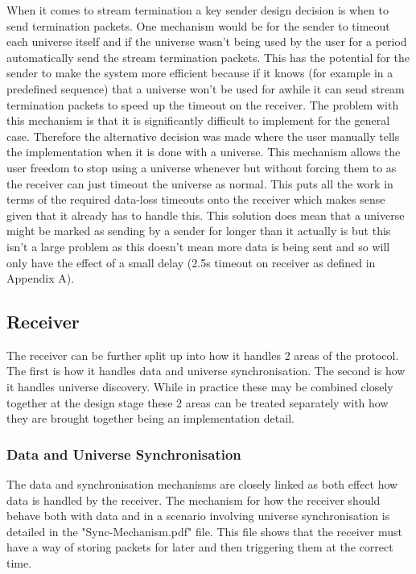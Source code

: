 \documentclass[11pt,a4paper]{article}
\begin{document}
When it comes to stream termination a key sender design decision is when to send termination packets. One mechanism would be for the sender to timeout each universe itself and if the universe wasn't being used by the user for a period automatically send the stream termination packets. This has the potential for the sender to make the system more efficient because if it knows (for example in a predefined sequence) that a universe won't be used for awhile it can send stream termination packets to speed up the timeout on the receiver. The problem with this mechanism is that it is significantly difficult to implement for the general case. Therefore the alternative decision was made where the user manually tells the implementation when it is done with a universe. This mechanism allows the user freedom to stop using a universe whenever but without forcing them to as the receiver can just timeout the universe as normal. This puts all the work in terms of the required data-loss timeouts onto the receiver which makes sense given that it already has to handle this. This solution does mean that a universe might be marked as sending by a sender for longer than it actually is but this isn't a large problem as this doesn't mean more data is being sent and so will only have the effect of a small delay (2.5s timeout on receiver as defined in \cite{ANSI_E1.31} Appendix A).

\subsection{Receiver}
The receiver can be further split up into how it handles 2 areas of the protocol. The first is how it handles data and universe synchronisation. The second is how it handles universe discovery. While in practice these may be combined closely together at the design stage these 2 areas can be treated separately with how they are brought together being an implementation detail.

\subsubsection{Data and Universe Synchronisation}
The data and synchronisation mechanisms are closely linked as both effect how data is handled by the receiver. The mechanism for how the receiver should behave both with data and in a scenario involving universe synchronisation is detailed in the "Sync-Mechanism.pdf" file. This file shows that the receiver must have a way of storing packets for later and then triggering them at the correct time.
\end{document}
